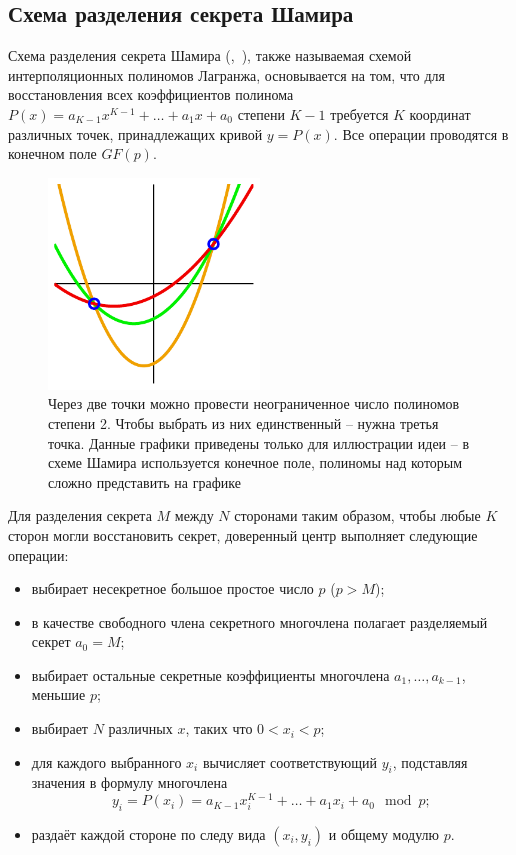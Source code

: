 \subsection[Схема Шамира]{Схема разделения секрета Шамира}

Схема разделения секрета Шамира (,~\cite{Shamir:1979}), также называемая схемой интерполяционных полиномов Лагранжа, основывается на том, что для восстановления всех коэффициентов полинома $P(x) = a_{K-1}x^{K-1} + \dots + a_1 x + a_0$ степени $K-1$ требуется $K$ координат различных точек, принадлежащих кривой $y=P(x)$. Все операции проводятся в конечном поле $GF(p)$.

\begin{figure}[thb]
	\centering
	\includegraphics[width=0.5\textwidth]{pic/shamir}
  \caption{Через две точки можно провести неограниченное число полиномов степени 2. Чтобы выбрать из них единственный -- нужна третья точка. Данные графики приведены только для иллюстрации идеи -- в схеме Шамира используется конечное поле, полиномы над которым сложно представить на графике}
  \label{fig:shamir}
\end{figure}

Для разделения секрета $M$ между $N$ сторонами таким образом, чтобы любые $K$ сторон могли восстановить секрет, доверенный центр выполняет следующие операции:
\begin{itemize}
	\item выбирает несекретное большое простое число $p$ ($p > M$);
	\item в качестве свободного члена секретного многочлена полагает разделяемый секрет $a_0 = M$;
	\item выбирает остальные секретные коэффициенты многочлена $a_1, \dots, a_{k-1}$, меньшие $p$;
	\item выбирает $N$ различных $x$, таких что $0 < x_i < p$;
	\item для каждого выбранного $x_i$ вычисляет соответствующий $y_i$, подставляя значения в формулу многочлена
		\[ y_i = P( x_i ) = a_{K-1}x_i^{K-1} + \dots + a_1 x_i + a_0 \mod p ;\]
	\item раздаёт каждой стороне по следу вида $(x_i, y_i)$ и общему модулю $p$.
\end{itemize}

